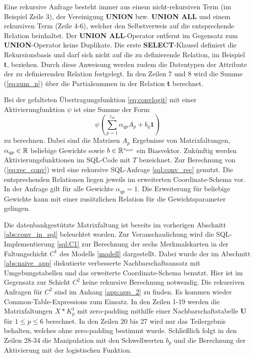 

Eine rekursive Anfrage besteht immer aus einem nicht-rekursiven Term (im Beispiel Zeile 3), der Vereinigung \textbf{UNION} bzw. \textbf{UNION ALL} und einem rekursiven Term (Zeile 4-6), welcher den Selbstverweis auf die entsprechende Relation beinhaltet. Der \textbf{UNION ALL}-Operator entfernt im Gegensatz zum \textbf{UNION}-Operator keine Duplikate. Die erste \textbf{SELECT}-Klausel definiert die Rekursionsbasis und darf sich nicht auf die zu definierende Relation, im Beispiel \textbf{t}, beziehen. Durch diese Anweisung werden zudem die Datentypen der Attribute der zu definierenden Relation festgelegt. In den Zeilen 7 und 8 wird die Summe (\ref{eq:sum_n}) über die Partialsummen in der Relation \textbf{t} berechnet. 

Bei der gefalteten Übertragungsfunktion \ref{eq:convlogit} mit einer Aktivierungfunktion $\psi$ ist eine Summe der Form
\begin{equation}
    \label{eq:rec_conv}
    \psi \left(\sum_{p=1}^{z_{in}} \alpha_{qp} A_p+ b_q \mathbf{1} \right)
\end{equation}
zu berechnen. Dabei sind die Matrizen $A_p$ Ergebnisse von Matrixfaltungen, $\alpha_{qp} \in \mathbb{R}$ beliebige Gewichte sowie $b \in \mathbb{R}^{z_{out}}$ ein Biasvektor. Zukünftig werden Aktivierungsfunktionen im SQL-Code mit $T$ bezeichnet. Zur Berechnung von (\ref{eq:rec_conv}) wird eine rekursive SQL-Anfrage \ref{sql:conv_rec} genutzt. Die entsprechenden Relationen liegen jeweils im erweiterten Coordinate-Schema vor. In der Anfrage gilt für alle Gewichte $\alpha_{qp}=1$. Die Erweiterung für beliebige Gewichte kann mit einer zusätzlichen Relation für die Gewichtsparameter gelingen. 



Die datenbankgestützte Matrixfaltung ist bereits im vorherigen Abschnitt \ref{abs:conv_in_sql} beleuchtet worden. Zur Veranschaulichung wird die SQL-Implementierung \ref{sql:C1} zur Berechnung der sechs Merkmalskarten in der Faltungschicht $C^1$ des Modells \ref{modell} dargestellt. Dabei wurde der im Abschnitt \ref{abs:naive_app} diskutierte verbesserte Nachbarschaftsansatz mit Umgebungstabellen und das erweiterte Coordinate-Schema benutzt. Hier ist im Gegensatz zur Schicht $C^2$ keine rekursive Berechnung notwendig. Die rekursiven Anfragen für $C^2$ sind im Anhang \ref{app:app_2} zu finden. Es kommen wieder Common-Table-Expressions zum Einsatz. In den Zeilen 1-19 werden die Matrixfaltungen $X \ast K^{1}_p$ mit zero-padding mithilfe einer Nachbarschaftstabelle \textbf{U} für $1 \leq p \leq 6$ berechnet. In den Zeilen 20 bis 27 wird nur das Teilergebnis behalten, welches ohne zero-padding bestimmt wurde. Schließlich folgt in den Zeilen 28-34 die Manipulation mit den Schwellwerten $b_p$ und die Berechnung der Aktivierung mit der logistischen Funktion.

